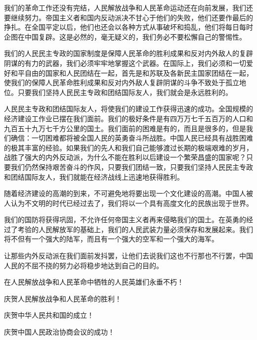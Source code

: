 我们的革命工作还没有完结，人民解放战争和人民革命运动还在向前发展，我们还要继续努力。帝国主义者和国内反动派决不甘心于他们的失败，他们还要作最后的挣扎。在全国平定以后，他们也还会以各种方式从事破坏和捣乱，他们将每日每时企图在中国复辟。这是必然的，毫无疑义的，我们务必不要松懈自己的警惕性。

我们的人民民主专政的国家制度是保障人民革命的胜利成果和反对内外敌人的复辟阴谋的有力的武器，我们必须牢牢地掌握这个武器。在国际上，我们必须和一切爱好和平自由的国家和人民团结在一起，首先是和苏联及各新民主国家团结在一起，使我们的保障人民革命胜利成果和反对内外敌人复辟阴谋的斗争不致处于孤立地位。只要我们坚持人民民主专政和团结国际友人，我们就会是永远胜利的。

人民民主专政和团结国际友人，将使我们的建设工作获得迅速的成功。全国规模的经济建设工作业已摆在我们面前。我们的极好条件是有四万万七千五百万的人口和九百五十九万七千方公里的国土。我们面前的困难是有的，而且是很多的，但是我们确信：一切困难都将被全国人民的英勇奋斗所战胜。中国人民已经具有战胜困难的极其丰富的经验。如果我们的先人和我们自己能够渡过长期的极端艰难的岁月，战胜了强大的内外反动派，为什么不能在胜利以后建设一个繁荣昌盛的国家呢？只要我们仍然保持艰苦奋斗的作风，只要我们团结一致，只要我们坚持人民民主专政和团结国际友人，我们就能在经济战线上迅速地获得胜利。

随着经济建设的高潮的到来，不可避免地将要出现一个文化建设的高潮。中国人被人认为不文明的时代已经过去了，我们将以一个具有高度文化的民族出现于世界。

我们的国防将获得巩固，不允许任何帝国主义者再来侵略我们的国土。在英勇的经过了考验的人民解放军的基础上，我们的人民武装力量必须保存和发展起来。我们将不但有一个强大的陆军，而且有一个强大的空军和一个强大的海军。

让那些内外反动派在我们面前发抖罢，让他们去说我们这也不行那也不行罢，中国人民的不屈不挠的努力必将稳步地达到自己的目的。

在人民解放战争和人民革命中牺牲的人民英雄们永垂不朽！

庆贺人民解放战争和人民革命的胜利！

庆贺中华人民共和国的成立！

庆贺中国人民政治协商会议的成功！